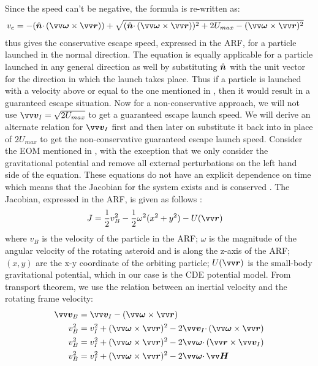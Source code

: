 Since the speed can't be negative, the formula is re-written as:
\begin{align}
    v_e &= -(\buv{n} \cdotp (\bv{\omega} \times \bv{r})) + \sqrt{(\buv{n} \cdotp (\bv{\omega} \times \bv{r}))^2 + 2U_{max} - (\bv{\omega} \times {\bv{r}})^2}
    \label{eqn:conservative_escape_speed}
\end{align}
 thus gives the conservative escape speed, expressed in the \gls{ARF}, for a particle launched in the normal direction. The equation is equally applicable for a particle launched in any general direction as well by substituting $\hat{\bm{n}}$ with the unit vector for the direction in which the launch takes place. Thus if a particle is launched with a velocity above or equal to the one mentioned in , then it would result in a guaranteed escape situation.
%
\newline\newline
%
Now for a non-conservative approach, we will not use $\bv{v}_I = \sqrt{2U_{max}}$ to get a guaranteed escape launch speed. We will derive an alternate relation for $\bv{v}_I$ first and then later on substitute it back into  in place of $2U_{max}$ to get the non-conservative guaranteed escape launch speed.
%
\newline\newline
%
Consider the \gls{EOM} mentioned in , with the exception that we only consider the gravitational potential and remove all external perturbations on the left hand side of the equation. These equations do not have an explicit dependence on time which means that the Jacobian for the system exists and is conserved \parencite{scheeresBook}. The Jacobian, expressed in the \gls{ARF}, is given as follows \parencite{scheeresBook}:
\begin{align}
    J &= \frac{1}{2} v_B^2 - \frac{1}{2} \omega^2(x^2 + y^2) - U(\bv{r})
    \label{eqn:jacobian}
\end{align}
where $v_B$ is the velocity of the particle in the \gls{ARF}; $\omega$ is the magnitude of the angular velocity of the rotating asteroid and is along the z-axis of the \gls{ARF}; $(x,y)$ are the x-y coordinate of the orbiting particle; $U(\bv{r})$ is the small-body gravitational potential, which in our case is the \gls{CDE} potential model. From transport theorem, we use the relation between an inertial velocity and the rotating frame velocity:
\begin{align}
    \bv{v}_B &= \bv{v}_I - (\bv{\omega} \times \bv{r}) \\
    v_B^2 &= v_I^2 + (\bv{\omega} \times \bv{r})^2 - 2 \bv{v}_I \cdotp (\bv{\omega} \times \bv{r}) \\
    v_B^2 &= v_I^2 + (\bv{\omega} \times \bv{r})^2 - 2 \bv{\omega} \cdotp (\bv{r} \times \bv{v}_I) \\
    v_B^2 &= v_I^2 + (\bv{\omega} \times \bv{r})^2 - 2 \bv{\omega} \cdotp \bv{H}
    \label{eqn:arf_velocity_modified_with_H}
\end{align}
